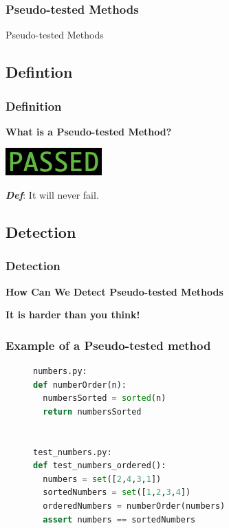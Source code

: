 \begin{frame}
	\frametitle{Pseudo-tested Methods}
	\begin{center}
    \huge{Pseudo-tested Methods}
  \end{center}
\end{frame}

\subsection{Defintion}
\begin{frame}
  \frametitle{Definition}
    \begin{center}
      \textbf{What is a Pseudo-tested Method?}

      \vspace{10mm}
      \includegraphics{images/passing}

      \vspace{10mm}
      \textbf{\textit{Def}}: It will never fail.
    \end{center}
\end{frame}

\subsection{Detection}
\begin{frame}
  \frametitle{Detection}
    \begin{center}
      \textbf{How Can We Detect Pseudo-tested Methods}

			\vspace{20mm}
			\textbf{It is harder than you think!}

    \end{center}
\end{frame}

\begin{frame}[fragile]
\frametitle{Example of a Pseudo-tested method}
	\begin{figure}[t!, scale = .75]
	\begin{lstlisting}[language = Python, basicstyle=\small, backgroundcolor = \color{lightgray}]
numbers.py:
def numberOrder(n):
  numbersSorted = sorted(n)
  return numbersSorted


test_numbers.py:
def test_numbers_ordered():
  numbers = set([2,4,3,1])
  sortedNumbers = set([1,2,3,4])
  orderedNumbers = numberOrder(numbers)
  assert numbers == sortedNumbers
	\end{lstlisting}
	\end{figure}
\end{frame}
